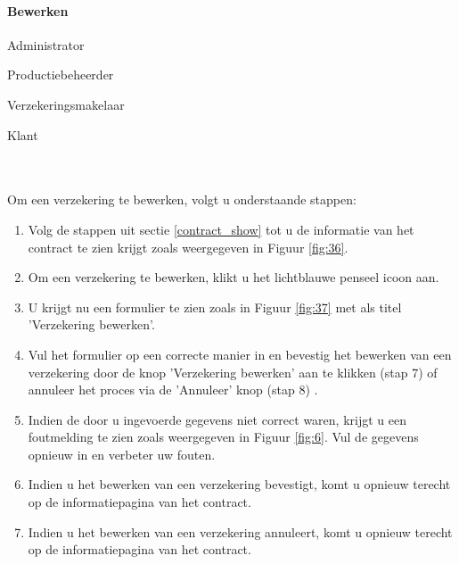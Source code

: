 \documentclass[11pt,openany]{article}
\newcommand{\cmark}{\ding{51}}%
\newcommand{\xmark}{\ding{55}}%
\newcommand{\done}{\rlap{$\square$}{\raisebox{2pt}{\large\hspace{1pt}\cmark}}%
	\hspace{-2.5pt}}
\newcommand{\wontfix}{\rlap{$\square$}{\large\hspace{1pt}\xmark}}
\begin{document}
\paragraph{Bewerken}
\label{insurance_edit}
\begin{todolist}
	\item[\done] Administrator
	\item[\done] Productiebeheerder
	\item[\done] Verzekeringsmakelaar
	\item[\wontfix] Klant 
\end{todolist}
\\
\\
Om een verzekering te bewerken, volgt u onderstaande stappen:
\begin{enumerate}
		\item  Volg de stappen uit sectie \ref{contract_show} tot u de informatie van het contract te zien krijgt zoals weergegeven in Figuur \ref{fig:36}.
	\item Om een verzekering te bewerken, klikt u het lichtblauwe penseel icoon aan.
	\item U krijgt nu een formulier te zien zoals in Figuur \ref{fig:37} met als titel 'Verzekering bewerken'.
	\item Vul het formulier op een correcte manier in en bevestig het bewerken van een verzekering door de knop 'Verzekering bewerken' aan te klikken (stap 7) of annuleer het proces via de 'Annuleer' knop (stap 8) .
	\item Indien de door u ingevoerde gegevens niet correct waren, krijgt u een foutmelding te zien zoals weergegeven in Figuur \ref{fig:6}. Vul de gegevens opnieuw in en verbeter uw fouten.
	\item Indien u het bewerken van een verzekering bevestigt, komt u opnieuw terecht op de informatiepagina van het contract.
	\item Indien u het bewerken van een verzekering annuleert, komt u opnieuw terecht op de informatiepagina van het contract.
\end{enumerate}
\newpage
\end{document}
